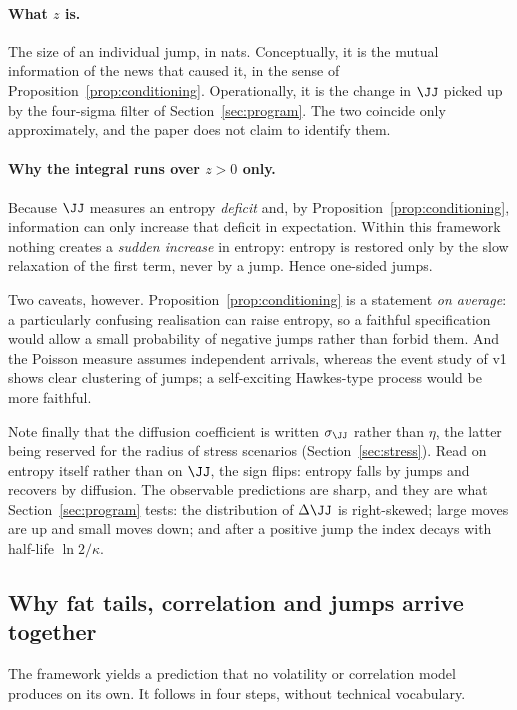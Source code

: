 \paragraph{What $z$ is.} The size of an individual jump, in nats. Conceptually, it
is the mutual information of the news that caused it, in the sense of
Proposition~\ref{prop:conditioning}. Operationally, it is the change in $\JJ$
picked up by the four-sigma filter of Section~\ref{sec:program}. The two coincide
only approximately, and the paper does not claim to identify them.

\paragraph{Why the integral runs over $z>0$ only.} Because $\JJ$ measures an
entropy \emph{deficit} and, by Proposition~\ref{prop:conditioning}, information
can only increase that deficit in expectation. Within this framework nothing
creates a \emph{sudden increase} in entropy: entropy is restored only by the slow
relaxation of the first term, never by a jump. Hence one-sided jumps.

Two caveats, however. Proposition~\ref{prop:conditioning} is a statement
\emph{on average}: a particularly confusing realisation can raise entropy, so a
faithful specification would allow a small probability of negative jumps rather
than forbid them. And the Poisson measure assumes independent arrivals, whereas
the event study of v1 shows clear clustering of jumps; a self-exciting
Hawkes-type process would be more faithful.

Note finally that the diffusion coefficient is written $\sigma_\JJ$ rather than
$\eta$, the latter being reserved for the radius of stress scenarios
(Section~\ref{sec:stress}). Read on entropy itself rather than on $\JJ$, the sign
flips: entropy falls by jumps and recovers by diffusion. The observable
predictions are sharp, and they are what Section~\ref{sec:program} tests: the
distribution of $\Delta\JJ$ is right-skewed; large moves are up and small moves
down; and after a positive jump the index decays with half-life $\ln 2/\kappa$.

\subsection{Why fat tails, correlation and jumps arrive together}

The framework yields a prediction that no volatility or correlation model
produces on its own. It follows in four steps, without technical vocabulary.

